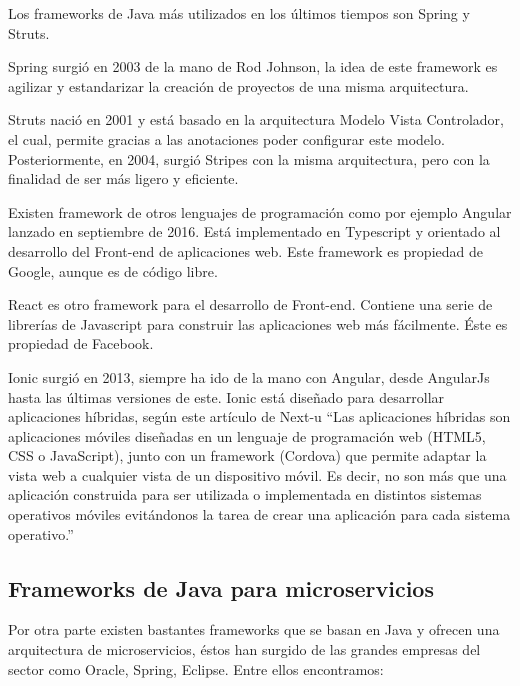 \documentclass[12pt]{report} %
\begin{document}
 Los frameworks de Java más utilizados en los últimos tiempos son Spring y Struts.
 
 Spring surgió en 2003 de la mano de Rod Johnson, la idea de este framework es agilizar y estandarizar la creación de proyectos de una misma arquitectura. 
 
 Struts nació en 2001 y está basado en la arquitectura Modelo Vista Controlador, el cual, permite gracias a las anotaciones poder configurar este modelo. Posteriormente, en 2004, surgió Stripes con la misma arquitectura, pero con la finalidad de ser más ligero y eficiente.
 
 Existen framework de otros lenguajes de programación como por ejemplo Angular lanzado en septiembre de 2016. Está implementado en Typescript y orientado al desarrollo del Front-end de aplicaciones web. Este framework es propiedad de Google, aunque es de código libre.
 
 React es otro framework para el desarrollo de Front-end. Contiene una serie de librerías de Javascript para construir las aplicaciones web más fácilmente. Éste es propiedad de Facebook.
 
 Ionic surgió en 2013, siempre ha ido de la mano con Angular, desde AngularJs hasta las últimas versiones de este. Ionic está diseñado para desarrollar aplicaciones híbridas, según este artículo de Next-u \cite{AppHibridas} “Las aplicaciones híbridas son aplicaciones móviles diseñadas en un lenguaje de programación web (HTML5, CSS o JavaScript), junto con un framework (Cordova) que permite adaptar la vista web a cualquier vista de un dispositivo móvil. Es decir, no son más que una aplicación construida para ser utilizada o implementada en distintos sistemas operativos móviles evitándonos la tarea de crear una aplicación para cada sistema operativo.”
 
 \subsection{Frameworks de Java para microservicios}
 Por otra parte existen bastantes frameworks que se basan en Java y ofrecen una arquitectura de microservicios, éstos han surgido de las grandes empresas del sector como Oracle, Spring, Eclipse. Entre ellos encontramos:
\end{document}
